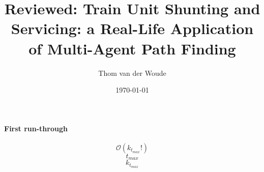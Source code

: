 \documentclass[a4paper,10pt,english]{article}
\title{Reviewed: Train Unit Shunting and Servicing: a Real-Life Application of Multi-Agent Path Finding}
\author{Thom van der Woude}
\date{\today}
\begin{document}
	\maketitle
	\paragraph{First run-through}
	\[\mathcal{O}(k_{t_{max}}!)\]
	\[t_{max}\]
	\[k_{t_{max}}\]
	\printbibliography
	
\end{document}
